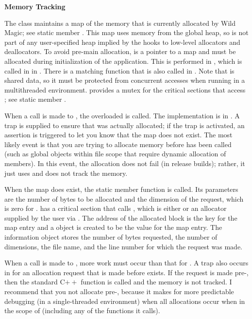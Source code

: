 \documentclass{article}
\begin{document}
\vspace*{0.1in}
{\bf Memory Tracking}

The  class maintains a map of the memory that is currently allocated
by Wild Magic; see static member .  This map uses memory from the
global heap, so is not part of any user-specified heap implied by the hooks to
low-level allocators and deallocators.  To avoid pre-main allocation, 
is a pointer to a map and must be allocated during initialization of the application.
This is performed in , which is called in 
in .  There is a matching  function
that is also called in .  Note that  is shared data, so it must
be protected from concurrent accesses when running in a multithreaded environment.
 provides a mutex for the critical sections that access ;
see static member .

When a call is made to , the overloaded  is called.
The implementation is in .  A trap is supplied to ensure that
 was actually allocated; if the trap is activated, an assertion is
triggered to let you know that the map does not exist.  The most likely event is
that you are trying to allocate memory before  has been called (such
as global objects within file scope that require dynamic allocation of members).
In this event, the allocation does not fail (in release builds); rather, it just
uses  and does not track the memory.

When the map does exist, the static member function  is
called.  Its parameters are the number of bytes to be allocated and the dimension
of the request, which is zero for .   has a critical
section that calls , which is either 
or an allocator supplied by the user via .  The address
of the allocated block is the key for the map entry and a 
object is created to be the value for the map entry.  The information object stores
the number of bytes requested, the number of dimensions, the file name, and the line
number for which the request was made.

When a call is made to , more work must occur than that for .
A trap also occurs in  for an allocation request that is made
before  exists.  If the request is made pre-, then the standard
C$++$  function is called and the memory is not tracked.  I recommend
that you not allocate pre-, because it makes for more predictable debugging
(in a single-threaded environment) when all allocations occur when in the scope of
 (including any of the functions it calls).
\end{document}
